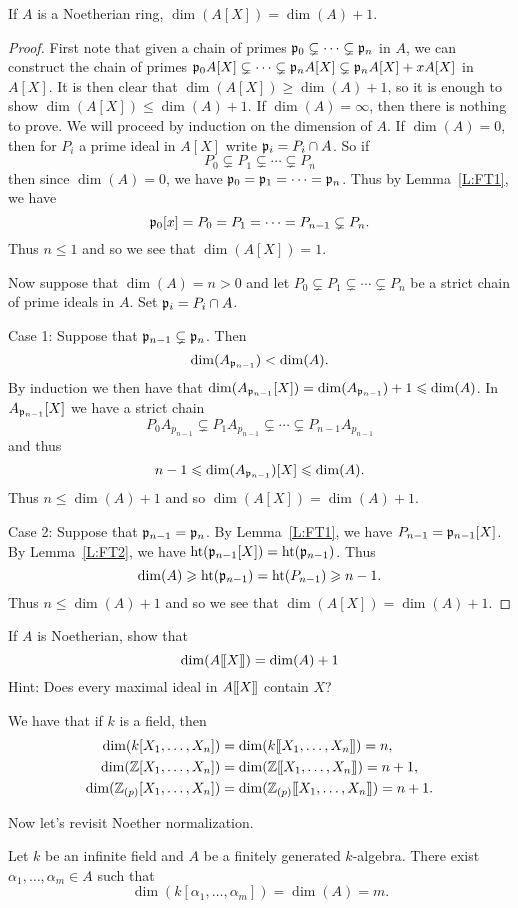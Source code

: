 \documentclass{ximera}
\begin{document}
\begin{theorem}
  If $A$ is a Noetherian ring, $\dim(A[X]) = \dim(A) + 1$.
  \begin{proof}
    First note that given a chain of primes $\mathfrak{p}_0 \subsetneq \cdots
    \subsetneq \mathfrak{p}_n$ in $A$, we can construct the chain of primes
    $\mathfrak{p}_0 A[X] \subsetneq \cdots \subsetneq \mathfrak{p}_n A[X] \subsetneq \mathfrak{p}_n
    A[X] + x A[X]$ in $A[X]$.  It is then clear that $\dim(A[X]) \ge
    \dim(A) + 1$, so it is enough to show $\dim(A[X]) \le\dim(A) +
    1$. If $\dim(A) = \infty$, then there is nothing to prove. We will
    proceed by induction on the dimension of $A$. If $\dim(A) = 0$,
    then for $P_i$ a prime ideal in $A[X]$ write $\mathfrak{p}_i = P_i\cap A$.
    So if
    \[
    P_0\subsetneq P_1\subsetneq \cdots \subsetneq P_n
    \]
    then since $\dim(A) = 0$, we have $\mathfrak{p}_0 = \mathfrak{p}_1 = \cdots = \mathfrak{p}_n$. Thus by Lemma~\ref{L:FT1}, we have 
    \[
    \mathfrak{p}_0[x] = P_0 = P_1 = \cdots = P_{n-1}\subsetneq P_n.
    \]
    Thus $n\le 1$ and so we see that $\dim(A[X]) = 1$.
    
    Now suppose that $\dim(A) = n >0$ and let $P_0 \subsetneq P_1
    \subsetneq \cdots \subsetneq P_n$ be a strict chain of prime
    ideals in $A$.  Set $\mathfrak{p}_i = P_i \cap A$.
    
    Case 1: Suppose that $\mathfrak{p}_{n-1} \subsetneq \mathfrak{p}_n$. Then
    \[
    \dim(A_{\mathfrak{p}_{n-1}})< \dim(A).
    \]
    By induction we then have that $\dim(A_{\mathfrak{p}_{n-1}}[X]) =
    \dim(A_{\mathfrak{p}_{n-1}})+1\leqslant \dim(A)$. In $A_{\mathfrak{p}_{n-1}}[X]$ we have a
    strict chain
    \[
    P_0A_{p_{n-1}} \subsetneq P_1A_{p_{n-1}} \subsetneq \cdots \subsetneq P_{n-1}A_{p_{n-1}}
    \] 
    and thus 
    \[
    n-1 \leqslant \dim(A_{\mathfrak{p}_{n-1}})[X]\leqslant \dim(A). 
    \]
    Thus $n \le\dim(A) +1$ and so  $\dim(A[X]) = \dim(A) + 1$.
    
    Case 2: Suppose that $\mathfrak{p}_{n-1} = \mathfrak{p}_n$. By Lemma~\ref{L:FT1}, we
    have $P_{n-1} = \mathfrak{p}_{n-1}[X]$.  By Lemma~\ref{L:FT2}, we have
    $\operatorname{ht}(\mathfrak{p}_{n-1}[X])=\operatorname{ht}(\mathfrak{p}_{n-1})$.  Thus
    \[
    \dim(A) \geqslant \operatorname{ht}(\mathfrak{p}_{n-1}) = \operatorname{ht}(P_{n-1}) \geqslant n-1.
    \]
    Thus $n\le \dim(A) + 1$ and so we see that $\dim(A[X]) = \dim(A) +1$.
  \end{proof}
\end{theorem}


\begin{exercise} If $A$ is Noetherian, show that 
\[
\dim(A[\hspace{-0.25ex}[ X ]\hspace{-0.25ex}]) = \dim(A) + 1
\]
Hint: Does every maximal ideal in $A[\hspace{-0.25ex}[ X ]\hspace{-0.25ex}]$ contain $X$?
\end{exercise}


\begin{corollary} We have that if $k$ is a field, then
\begin{align*}
\dim(k[X_1,\ldots,X_n]) &= \dim(k[\hspace{-0.25ex}[ X_1,\dots,X_n]\hspace{-0.25ex}]) = n, \\
\dim(\mathbb Z[X_1,\ldots,X_n]) &= \dim(\mathbb Z[\hspace{-0.25ex}[ X_1,\dots,X_n]\hspace{-0.25ex}]) = n+1, \\
\dim(\mathbb Z_{(p)}[X_1,\ldots,X_n]) &= \dim(\mathbb Z_{(p)}[\hspace{-0.25ex}[ X_1,\dots,X_n]\hspace{-0.25ex}]) = n+1.
\end{align*}
\end{corollary}


Now let's revisit Noether normalization.

\begin{corollary}
  Let $k$ be an infinite field and $A$ be a finitely generated
  $k$-algebra. There exist $\alpha_1,\dots,\alpha_m\in A$ such that
  \[
  \dim(k[\alpha_1,\dots,\alpha_m]) = \dim(A) = m.
  \]
\end{corollary}
\end{document}
